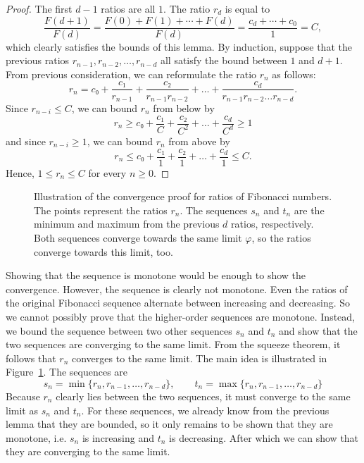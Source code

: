\begin{proof}
  The first $d - 1$ ratios are all $1$.
  The ratio $r_d$ is equal to
  \[
    \frac{F(d+1)}{F(d)} = \frac{F(0) + F(1) + ⋯ + F(d)}{F(d)} = \frac{c_d + ⋯ + c_0}{1} = C,
  \]
  which clearly satisfies the bounds of this lemma.
  By induction, suppose that the previous ratios $r_{n-1}, r_{n-2}, …, r_{n-d}$
  all satisfy the bound between $1$ and $d+1$.
  From previous consideration, we can reformulate the ratio $r_n$ as follows:
  \[
    r_n = c₀ + \frac{c₁}{r_{n-1}} + \frac{c₂}{r_{n-1} r_{n-2}} + \dots + \frac{c_d}{r_{n-1} r_{n-2} \dots r_{n-d}}.
  \]
  Since $r_{n-i} ≤ C$, we can bound $r_n$ from below by
  \[
    r_n ≥ c₀ + \frac{c₁}{C} + \frac{c₂}{C^2} + \dots + \frac{c_d}{C^d} ≥ 1
  \]
  and since $r_{n-i} ≥ 1$, we can bound $r_n$ from above by
  \[
    r_n ≤ c₀ + \frac{c₁}{1} + \frac{c₂}{1} + \dots + \frac{c_d}{1} ≤ C.
  \]
  Hence, $1 ≤ r_n ≤ C$ for every $n ≥ 0$.
\end{proof}

\begin{figure}[tbp]
  \centering
  
  \caption{
    Illustration of the convergence proof for ratios of Fibonacci numbers.
    The points represent the ratios $r_n$.
    The sequences $s_n$ and $t_n$ are the minimum and maximum from the previous
    $d$ ratios, respectively.
    Both sequences converge towards the same limit $φ$, so the ratios converge
    towards this limit, too.
  }
  \label{fig:fibonacci-convergence}
\end{figure}

Showing that the sequence is monotone would be enough to show the convergence.
However, the sequence is clearly not monotone.
Even the ratios of the original Fibonacci sequence alternate between increasing
and decreasing.
So we cannot possibly prove that the higher-order sequences are monotone.
Instead, we bound the sequence between two other sequences $s_n$ and $t_n$
and show that the two sequences are converging to the same limit.
From the squeeze theorem, it follows that $r_n$ converges to the same limit.
The main idea is illustrated in Figure~\ref{fig:fibonacci-convergence}.
The sequences are
\[
  s_n = \min\{r_n, r_{n-1}, …, r_{n-d} \}, \qquad t_n = \max\{r_n, r_{n-1}, …, r_{n-d}\}
\]
Because $r_n$ clearly lies between the two sequences, it must converge to the same limit as $s_n$ and $t_n$.
For these sequences, we already know from the previous lemma that they are bounded,
so it only remains to be shown that they are monotone,
i.e. $s_n$ is increasing and $t_n$ is decreasing.
After which we can show that they are converging to the same limit.

